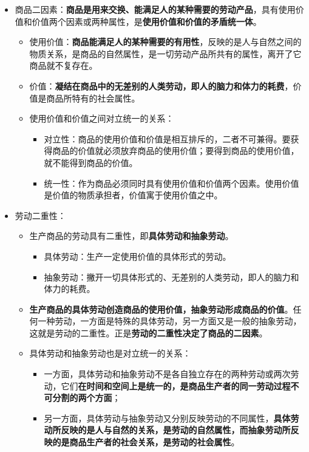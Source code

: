 \documentclass[
]{article}
\begin{document}
\begin{itemize}
\item
  商品二因素：\textbf{商品是用来交换、能满足人的某种需要的劳动产品}，具有使用价值和价值两个因素或两种属性，是\textbf{使用价值和价值的矛盾统一体}。

  \begin{itemize}
  \item
    使用价值：\textbf{商品能满足人的某种需要的有用性}，反映的是人与自然之间的物质关系，是商品的自然属性，是一切劳动产品所共有的属性，离开了它商品就不复存在。
  \item
    价值：\textbf{凝结在商品中的无差别的人类劳动，即人的脑力和体力的耗费}，价值是商品所特有的社会属性。
  \item
    使用价值和价值之间对立统一的关系：

    \begin{itemize}
    \item
      对立性：商品的使用价值和价值是相互排斥的，二者不可兼得。要获得商品的价值就必须放弃商品的使用价值；要得到商品的使用价值，就不能得到商品的价值。
    \item
      统一性：作为商品必须同时具有使用价值和价值两个因素。使用价值是价值的物质承担者，价值寓于使用价值之中。
    \end{itemize}
  \end{itemize}
\item
  劳动二重性：

  \begin{itemize}
  \item
    生产商品的劳动具有二重性，即\textbf{具体劳动和抽象劳动}。

    \begin{itemize}
    \item
      具体劳动：生产一定使用价值的具体形式的劳动。
    \item
      抽象劳动：撇开一切具体形式的、无差别的人类劳动，即人的脑力和体力的耗费。
    \end{itemize}
  \item
    \textbf{生产商品的具体劳动创造商品的使用价值，抽象劳动形成商品的价值}。任何一种劳动，一方面是特殊的具体劳动，另一方面又是一般的抽象劳动，这就是劳动的二重性。正是\textbf{劳动的二重性决定了商品的二因素}。
  \item
    具体劳动和抽象劳动也是对立统一的关系：

    \begin{itemize}
    \item
      一方面，具体劳动和抽象劳动不是各自独立存在的两种劳动或两次劳动，它们\textbf{在时间和空间上是统一的，是商品生产者的同一劳动过程不可分割的两个方面}；
    \item
      另一方面，具体劳动与抽象劳动又分别反映劳动的不同属性，\textbf{具体劳动所反映的是人与自然的关系，是劳动的自然属性，而抽象劳动所反映的是商品生产者的社会关系，是劳动的社会属性}。
    \end{itemize}
  \end{itemize}
\end{itemize}
\end{document}
